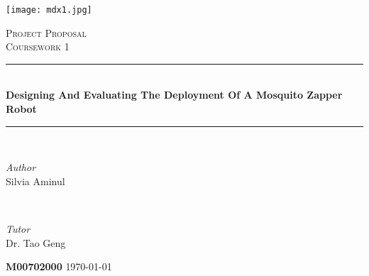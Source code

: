 \documentclass[11pt]{article}
\begin{document}
				
		\fancyhead{} %
		\fancyfoot{} %
		\fancyfoot[CO]{\thepage}
		\begin{titlepage}	
			\centering
			
			\newcommand{\HRule}{\rule{\linewidth}{0.7mm }} %
			\newcommand{\Botline}{\rule{\linewidth}{0.4mm }} %
			
			
			\texttt{[image: mdx1.jpg]}
			
			\textsc{\Large Project Proposal }\\[0.5cm] %
			
			\textsc{\large Coursework 1}\\[0.5cm] %
			
			
			\HRule\\[0.4cm]
			
			{\huge\bfseries Designing And Evaluating The Deployment Of A Mosquito Zapper Robot}\\[0.4cm] %
			
			\Botline\\[1.5cm]
			
			
			\begin{minipage}{0.4\textwidth}
				\begin{flushleft}
					\large
					\textit{Author}\\
					Silvia Aminul 
				\end{flushleft}
			\end{minipage}
			~
			\begin{minipage}{0.4\textwidth}
				\begin{flushright}
					\large
					\textit{Tutor}\\
					Dr. Tao Geng  
				\end{flushright}
				
				
			\end{minipage}
			
			
			\vfill\vfill\vfill
			
			\vfill
			
			
			
			{\bfseries M00702000 }
			\vfill
			{\large\today}
	\end{titlepage}
	\newpage
	\tableofcontents
	  
\end{document}
